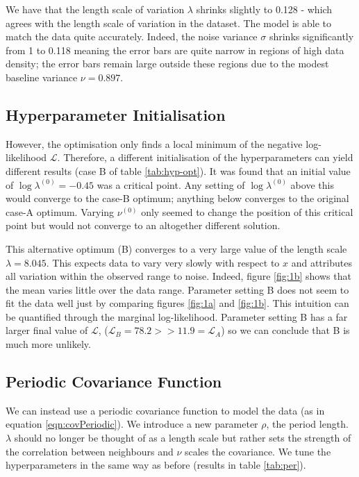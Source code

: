 \documentclass[]{article}
\newcommand{\Lcal}{\mathcal{L}}
\begin{document}
We have that the length scale of variation $\lambda$ shrinks slightly to 0.128 - which agrees with the length scale of variation in the dataset. The model is able to match the data quite accurately. Indeed, the noise variance $\sigma$ shrinks significantly from 1 to 0.118 meaning the error bars are quite narrow in regions of high data density; the error bars remain large outside these regions due to the modest baseline variance $\nu=0.897$.

\subsection{Hyperparameter Initialisation}

However, the optimisation only finds a local minimum of the negative log-likelihood $\Lcal$. Therefore, a different initialisation of the hyperparameters can yield different results (case B of table \ref{tab:hyp-opt}). It was found that an initial value of $\log \lambda^{(0)} = -0.45$ was a critical point. Any setting of $\log \lambda^{(0)}$ above this would converge to the case-B optimum; anything below converges to the original case-A optimum. Varying $\nu^{(0)}$ only seemed to change the position of this critical point but would not converge to an altogether different solution.

This alternative optimum (B) converges to a very large value of the length scale $\lambda=8.045$. This expects data to vary very slowly with respect to $x$ and attributes all variation within the observed range to noise. Indeed, figure \ref{fig:1b} shows that the mean varies little over the data range. Parameter setting B does not seem to fit the data well just by comparing figures \ref{fig:1a} and \ref{fig:1b}. This intuition can be quantified through the marginal log-likelihood. Parameter setting B has a far larger final value of $\Lcal$, ($\Lcal_B=78.2 >> 11.9 = \Lcal_A$) so we can conclude that B is much more unlikely.


\subsection{Periodic Covariance Function}

We can instead use a periodic covariance function to model the data (as in equation \ref{eqn:covPeriodic}). We introduce a new parameter $\rho$, the period length. $\lambda$ should no longer be thought of as a length scale but rather sets the strength of the correlation between neighbours and $\nu$ scales the covariance. We tune the hyperparameters in the same way as before (results in table \ref{tab:per}).
\end{document}
